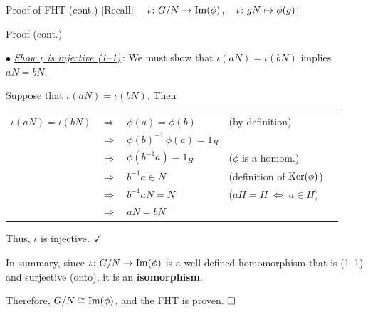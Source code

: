 \documentclass[8pt]{beamer}
\newcommand{\Pause}{}      %
\begin{document}
\begin{frame}{Proof of FHT (cont.) [{\small Recall: 
        $\quad\iota\colon G/N\rightarrow\operatorname{Im}(\phi)\,,\quad\iota\colon 
        gN\mapsto\phi(g)$}]}
  
  \begin{exampleblock}{Proof (cont.)} %
    
    $\bullet$ \underline{\emph{Show $\iota$ is injective (1--1)}}\,: \Pause
    We must show that $\iota(aN)=\iota(bN)$ implies $aN=bN$.
    
    \pause
    \bigskip
    
    Suppose that $\iota(aN)=\iota(bN)$. \Pause Then
    
    \begin{center}\renewcommand{\arraystretch}{1.2}
      \begin{tabular}{rclll}
        $\iota(aN)=\iota(bN)$ & $\Longrightarrow$ & $\phi(a)=\phi(b)$ & 
        (by definition) \Pause \\
        & $\Longrightarrow$ & $\phi(b)^{-1}\,\phi(a)=1_H$ \Pause & \\ 
        & $\Longrightarrow$ & $\phi(b^{-1}a)=1_H$ &
        ($\phi$ is a homom.) \Pause \\
        & $\Longrightarrow$ & $b^{-1}a\in N$ &
        (definition of $\operatorname{Ker}(\phi)$) \Pause \\
        & $\Longrightarrow$ & $b^{-1}aN=N$ & 
        ($aH=H\;\Leftrightarrow\;a\in H$) \Pause \\
        & $\Longrightarrow$ & $aN=bN$ & 
      \end{tabular}
    \end{center}
    
    Thus, $\iota$ is injective. $\hfill\checkmark$ 
    
    \bigskip\pause
    
    In summary, since $\iota\colon G/N\to\operatorname{Im}(\phi)$ is a well-defined
    homomorphism that is  (1--1) and
    {\color{blue}surjective} (onto), it is an \textbf{isomorphism}.
    
    \bigskip\Pause
    
    Therefore, $G/N\cong\operatorname{Im}(\phi)$, and the FHT is proven. $\hfill\Box$
    
  \end{exampleblock}
  
\end{frame}

\end{document}
